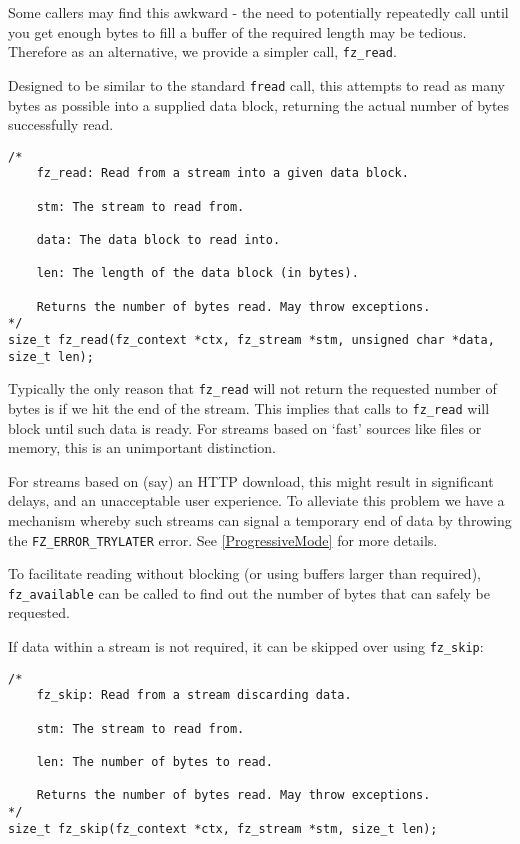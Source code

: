 \documentclass[oneside]{book}
\newcommand{\rjwref}[1] {\autoref{#1} \nameref{#1}}
\begin{document}
Some callers may find this awkward - the need to potentially repeatedly call until you get enough bytes to fill a buffer of the required length may be tedious. Therefore as an alternative, we provide a simpler call, \texttt{fz\_read}.

Designed to be similar to the standard \texttt{fread} call, this attempts to read as many bytes as possible into a supplied data block, returning the actual number of bytes successfully read.

\begin{lstlisting}
/*
	fz_read: Read from a stream into a given data block.

	stm: The stream to read from.

	data: The data block to read into.

	len: The length of the data block (in bytes).

	Returns the number of bytes read. May throw exceptions.
*/
size_t fz_read(fz_context *ctx, fz_stream *stm, unsigned char *data, size_t len);
\end{lstlisting}

Typically the only reason that \texttt{fz\_read} will not return the requested number of bytes is if we hit the end of the stream. This implies that calls to \texttt{fz\_read} will block until such data is ready. For streams based on `fast' sources like files or memory, this is an unimportant distinction.

For streams based on (say) an HTTP download, this might result in significant delays, and an unacceptable user experience. To alleviate this problem we have a mechanism whereby such streams can signal a temporary end of data by throwing the \texttt{FZ\_ERROR\_TRYLATER} error. See \rjwref{ProgressiveMode} for more details.

To facilitate reading without blocking (or using buffers larger than required), \texttt{fz\_available} can be called to find out the number of bytes that can safely be requested.

If data within a stream is not required, it can be skipped over using \texttt{fz\_skip}:

\begin{lstlisting}
/*
	fz_skip: Read from a stream discarding data.

	stm: The stream to read from.

	len: The number of bytes to read.

	Returns the number of bytes read. May throw exceptions.
*/
size_t fz_skip(fz_context *ctx, fz_stream *stm, size_t len);
\end{lstlisting}
\end{document}

